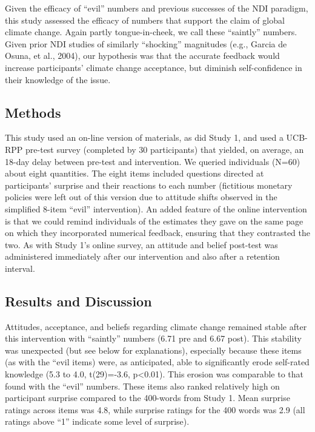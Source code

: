 Given the efficacy of “evil” numbers and previous successes of the NDI paradigm,
this study assessed the efficacy of numbers that support the claim of global
climate change. Again partly tongue-in-cheek, we call these “saintly” numbers.
Given prior NDI studies of similarly “shocking” magnitudes (e.g., Garcia de
Osuna, et al., 2004), our hypothesis was that the accurate feedback would
increase participants’ climate change acceptance, but diminish self-confidence
in their knowledge of the issue.


\subsection{Methods}

This study used an on-line version of materials, as did Study 1, and used a
UCB-RPP pre-test survey (completed by 30 participants) that yielded, on average,
an 18-day delay between pre-test and intervention. We queried individuals (N=60)
about eight quantities. The eight items included questions directed at
participants’ surprise and their reactions to each number (fictitious monetary
policies were left out of this version due to attitude shifts observed in the
simplified 8-item “evil” intervention). An added feature of the online
intervention is that we could remind individuals of the estimates they gave on
the same page on which they incorporated numerical feedback, ensuring that they
contrasted the two. As with Study 1’s online survey, an attitude and belief
post-test was administered immediately after our intervention and also after a
retention interval.


\subsection{Results and Discussion}

Attitudes, acceptance, and beliefs regarding climate change remained stable
after this intervention with “saintly” numbers (6.71 pre and 6.67 post). This
stability was unexpected (but see below for explanations), especially because
these items (as with the “evil items) were, as anticipated, able to
significantly erode self-rated knowledge (5.3 to 4.0, t(29)=-3.6, p<0.01). This
erosion was comparable to that found with the “evil” numbers. These items also
ranked relatively high on participant surprise compared to the 400-words from
Study 1. Mean surprise ratings across items was 4.8, while surprise ratings for
the 400 words was 2.9 (all ratings above “1” indicate some level of surprise).

